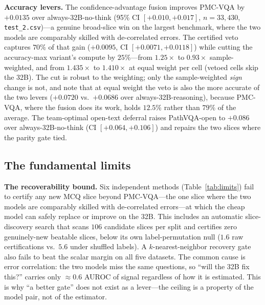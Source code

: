\documentclass[conference]{IEEEtran}
\begin{document}
\textbf{Accuracy levers.} The confidence-advantage fusion improves PMC-VQA by $+0.0135$ over always-32B-no-think (95\% CI $[+0.010,+0.017]$, $n{=}33{,}430$, \texttt{test\_2.csv})---a genuine broad-slice win on the largest benchmark, where the two models are comparably skilled with de-correlated errors. The certified veto captures $70\%$ of that gain ($+0.0095$, CI $[+0.0071,+0.0118]$) while cutting the accuracy-max variant's compute by $25\%$---from $1.25{\times}$ to $0.93{\times}$ sample-weighted, and from $1.435{\times}$ to $1.410{\times}$ at equal weight per cell (vetoed cells skip the 32B). The cut is robust to the weighting; only the sample-weighted \emph{sign} change is not, and note that at equal weight the veto is also the more accurate of the two levers ($+0.0720$ vs.\ $+0.0686$ over always-32B-reasoning), because PMC-VQA, where the fusion does its work, holds $12.5\%$ rather than $79\%$ of the average. The team-optimal open-text deferral raises PathVQA-open to $+0.086$ over always-32B-no-think (CI $[+0.064,+0.106]$) and repairs the two slices where the parity gate tied.

\subsection{The fundamental limits}\label{sec:limits}

\textbf{The recoverability bound.} Six independent methods (Table~\ref{tab:limits}) fail to certify any new MCQ slice beyond PMC-VQA---the one slice where the two models are comparably skilled with de-correlated errors---at which the cheap model can safely replace or improve on the 32B. This includes an automatic slice-discovery search that scans $106$ candidate slices per split and certifies zero genuinely-new beatable slices, below its own label-permutation null ($1.6$ raw certifications vs.\ $5.6$ under shuffled labels). A $k$-nearest-neighbor recovery gate also fails to beat the scalar margin on all five datasets. The common cause is error correlation: the two models miss the same questions, so ``will the 32B fix this?'' carries only ${\approx}0.6$ AUROC of signal regardless of how it is estimated. This is why ``a better gate'' does not exist as a lever---the ceiling is a property of the model pair, not of the estimator.
\end{document}
